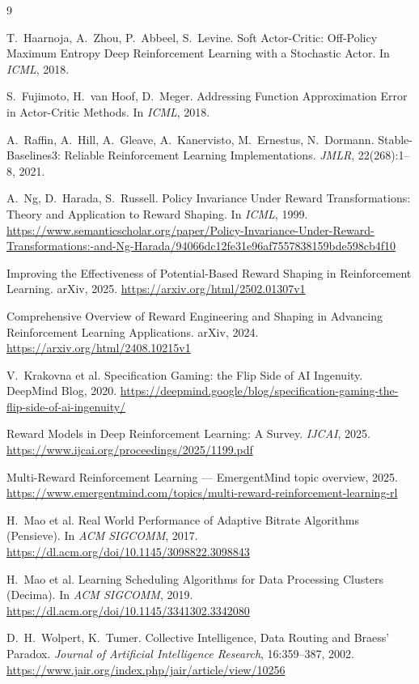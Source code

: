 \documentclass[11pt]{article}
\begin{document}
\begin{thebibliography}{9}

T.~Haarnoja, A.~Zhou, P.~Abbeel, S.~Levine.
\newblock Soft Actor-Critic: Off-Policy Maximum Entropy Deep Reinforcement
  Learning with a Stochastic Actor.
\newblock In \textit{ICML}, 2018.

S.~Fujimoto, H.~van Hoof, D.~Meger.
\newblock Addressing Function Approximation Error in Actor-Critic Methods.
\newblock In \textit{ICML}, 2018.

A.~Raffin, A.~Hill, A.~Gleave, A.~Kanervisto, M.~Ernestus, N.~Dormann.
\newblock Stable-Baselines3: Reliable Reinforcement Learning Implementations.
\newblock \textit{JMLR}, 22(268):1--8, 2021.

A.~Ng, D.~Harada, S.~Russell.
\newblock Policy Invariance Under Reward Transformations: Theory and Application
  to Reward Shaping.
\newblock In \textit{ICML}, 1999.
\newblock \url{https://www.semanticscholar.org/paper/Policy-Invariance-Under-Reward-Transformations:-and-Ng-Harada/94066dc12fe31e96af7557838159bde598cb4f10}

Improving the Effectiveness of Potential-Based Reward Shaping in Reinforcement
  Learning. arXiv, 2025.
\newblock \url{https://arxiv.org/html/2502.01307v1}

Comprehensive Overview of Reward Engineering and Shaping in Advancing
  Reinforcement Learning Applications. arXiv, 2024.
\newblock \url{https://arxiv.org/html/2408.10215v1}

V.~Krakovna et al.
\newblock Specification Gaming: the Flip Side of AI Ingenuity.
\newblock DeepMind Blog, 2020.
\newblock \url{https://deepmind.google/blog/specification-gaming-the-flip-side-of-ai-ingenuity/}

Reward Models in Deep Reinforcement Learning: A Survey.
\newblock \textit{IJCAI}, 2025.
\newblock \url{https://www.ijcai.org/proceedings/2025/1199.pdf}

Multi-Reward Reinforcement Learning --- EmergentMind topic overview, 2025.
\newblock \url{https://www.emergentmind.com/topics/multi-reward-reinforcement-learning-rl}

H.~Mao et al.
\newblock Real World Performance of Adaptive Bitrate Algorithms (Pensieve).
\newblock In \textit{ACM SIGCOMM}, 2017.
\newblock \url{https://dl.acm.org/doi/10.1145/3098822.3098843}

H.~Mao et al.
\newblock Learning Scheduling Algorithms for Data Processing Clusters (Decima).
\newblock In \textit{ACM SIGCOMM}, 2019.
\newblock \url{https://dl.acm.org/doi/10.1145/3341302.3342080}

D.~H.~Wolpert, K.~Tumer.
\newblock Collective Intelligence, Data Routing and Braess' Paradox.
\newblock \textit{Journal of Artificial Intelligence Research}, 16:359--387, 2002.
\newblock \url{https://www.jair.org/index.php/jair/article/view/10256}

\end{thebibliography}
\end{document}
